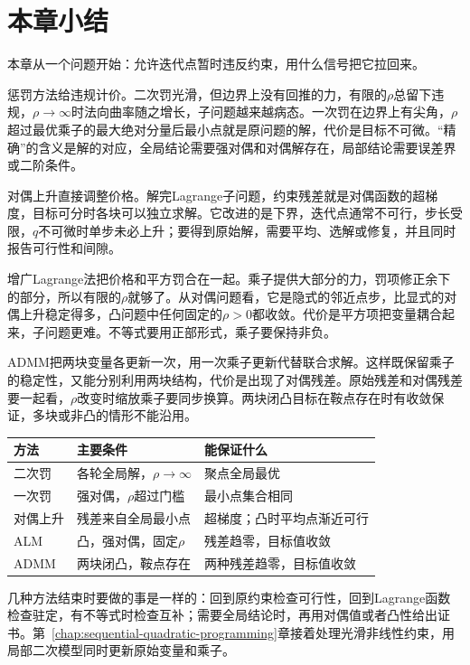 \section{本章小结}
\label{sec:pm-summary}

本章从一个问题开始：允许迭代点暂时违反约束，用什么信号把它拉回来。

惩罚方法给违规计价。二次罚光滑，但边界上没有回推的力，有限的$\rho$总留下违规，$\rho\to\infty$时法向曲率随之增长，子问题越来越病态。一次罚在边界上有尖角，$\rho$超过最优乘子的最大绝对分量后最小点就是原问题的解，代价是目标不可微。“精确”的含义是解的对应，全局结论需要强对偶和对偶解存在，局部结论需要误差界或二阶条件。

对偶上升直接调整价格。解完Lagrange子问题，约束残差就是对偶函数的超梯度，目标可分时各块可以独立求解。它改进的是下界，迭代点通常不可行，步长受限，$q$不可微时单步未必上升；要得到原始解，需要平均、选解或修复，并且同时报告可行性和间隙。

增广Lagrange法把价格和平方罚合在一起。乘子提供大部分的力，罚项修正余下的部分，所以有限的$\rho$就够了。从对偶问题看，它是隐式的邻近点步，比显式的对偶上升稳定得多，凸问题中任何固定的$\rho>0$都收敛。代价是平方项把变量耦合起来，子问题更难。不等式要用正部形式，乘子要保持非负。

ADMM把两块变量各更新一次，用一次乘子更新代替联合求解。这样既保留乘子的稳定性，又能分别利用两块结构，代价是出现了对偶残差。原始残差和对偶残差要一起看，$\rho$改变时缩放乘子要同步换算。两块闭凸目标在鞍点存在时有收敛保证，多块或非凸的情形不能沿用。

\begin{BookInlineTable}
  \centering
  \small
  \begin{tabular}{@{}lll@{}}
    \toprule
    方法 & 主要条件 & 能保证什么\\
    \midrule
    二次罚 & 各轮全局解，$\rho\to\infty$ & 聚点全局最优\\
    一次罚 & 强对偶，$\rho$超过门槛 & 最小点集合相同\\
    对偶上升 & 残差来自全局最小点 & 超梯度；凸时平均点渐近可行\\
    ALM & 凸，强对偶，固定$\rho$ & 残差趋零，目标值收敛\\
    ADMM & 两块闭凸，鞍点存在 & 两种残差趋零，目标值收敛\\
    \bottomrule
  \end{tabular}
  \caption{本章各方法的主要条件与保证。局部结论和近似求解下的结论见各节。}
  \label{tab:pm-summary}
\end{BookInlineTable}

几种方法结束时要做的事是一样的：回到原约束检查可行性，回到Lagrange函数检查驻定，有不等式时检查互补；需要全局结论时，再用对偶值或者凸性给出证书。第~\ref{chap:sequential-quadratic-programming}章接着处理光滑非线性约束，用局部二次模型同时更新原始变量和乘子。
